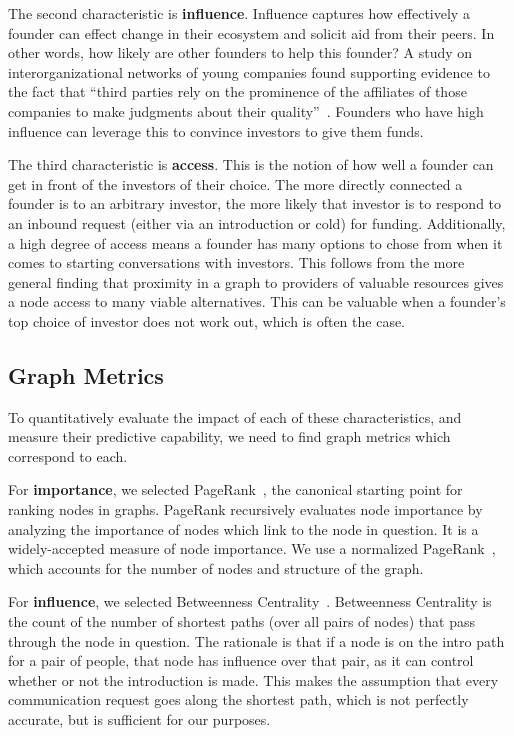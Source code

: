 The second characteristic is \textbf{influence}. Influence captures how effectively a founder can effect change in their ecosystem and solicit aid from their peers. In other words, how likely are other founders to help this founder? A study on interorganizational networks of young companies found supporting evidence to the fact that ``third parties rely on the prominence of the affiliates of those companies to make judgments about their quality''~\cite{10.2307/2666998}. Founders who have high influence can leverage this to convince investors to give them funds.

The third characteristic is \textbf{access}. This is the notion of how well a founder can get in front of the investors of their choice. The more directly connected a founder is to an arbitrary investor, the more likely that investor is to respond to an inbound request (either via an introduction or cold) for funding. Additionally, a high degree of access means a founder has many options to chose from when it comes to starting conversations with investors. This follows from the more general finding that proximity in a graph to providers of valuable resources gives a node access to many viable alternatives\cite{10.2307/3069443}. This can be valuable when a founder's top choice of investor does not work out, which is often the case.

\subsection{Graph Metrics}

To quantitatively evaluate the impact of each of these characteristics, and measure their predictive capability, we need to find graph metrics which correspond to each.

For \textbf{importance}, we selected PageRank~\cite{page1999pagerank}, the canonical starting point for ranking nodes in graphs. PageRank recursively evaluates node importance by analyzing the importance of nodes which link to the node in question. It is a widely-accepted measure of node importance. We use a normalized PageRank~\cite{berberich2007comparing}, which accounts for the number of nodes and structure of the graph.

For \textbf{influence}, we selected Betweenness Centrality~\cite{10.2307/3033543}. Betweenness Centrality is the count of the number of shortest paths (over all pairs of nodes) that pass through the node in question. The rationale is that if a node is on the intro path for a pair of people, that node has influence over that pair, as it can control whether or not the introduction is made. This makes the assumption that every communication request goes along the shortest path, which is not perfectly accurate, but is sufficient for our purposes.

